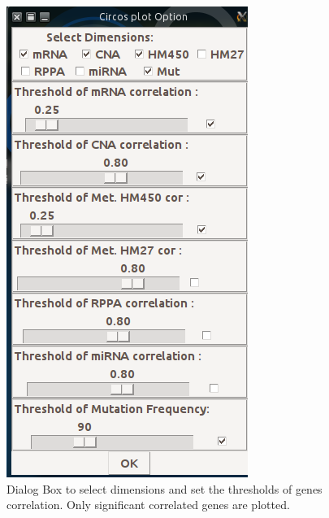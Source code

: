 \documentclass[a4paper]{article}
\begin{document}
 
   \begin{figure}[!ht]
  \centering
 \includegraphics[scale=0.01]{image/dialogCircos.png}
 \caption{Dialog Box to select dimensions and set the thresholds of genes correlation. Only significant correlated genes are plotted.}
 \label{dialogCircos}
 \end{figure}
  
\end{document}
